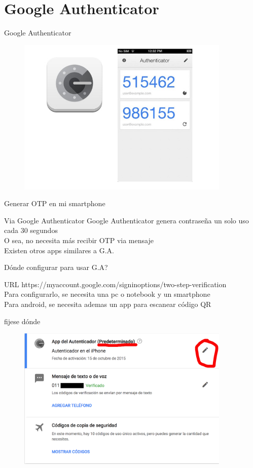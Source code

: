 \documentclass[11pt]{beamer}
\begin{document}
\section{Google Authenticator}
\begin{frame}{Google Authenticator}
  \begin{figure}
    \includegraphics[width=4in]{images/google-authenticator.jpg}
  \end{figure}
\end{frame}
\begin{frame}{Generar OTP en mi smartphone}
  \begin{block}{Via Google Authenticator}
    Google Authenticator genera contrase\~na un solo uso cada 30 segundos\\
    O sea, no necesita m\'as recibir OTP via mensaje\\
    \color[rgb]{0,0.5,1} Existen otros apps similares a G.A.\\
  \end{block}
\end{frame}
\begin{frame}{D\'onde configurar para usar G.A?}
  \begin{block}{URL}
    https://myaccount.google.com/signinoptions/two-step-verification\\
    \color[rgb]{1,0,0} Para configurarlo, se necesita una pc o notebook y un smartphone\\
    \color[rgb]{0,0.5,1} Para android, se necesita ademas un app para escanear c\'odigo QR\\
  \end{block}
\end{frame}
\begin{frame}{fijese d\'onde}
  \begin{figure}
    \includegraphics[width=4in]{images/2wayauth.png}
  \end{figure}
\end{frame}
\end{document}
